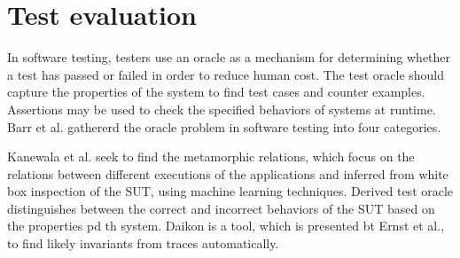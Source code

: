 
\section{Test evaluation}
	
In software testing, testers use an oracle as a mechanism for determining whether a test has passed or failed
in order to reduce human cost.
The test oracle should capture the properties of the system to find test cases and counter examples.
Assertions may be used to check the specified behaviors of systems at runtime.
Barr et al.\cite{OracleProblem} gathererd the oracle problem in software testing into four categories.

Kanewala et al.\cite{DetectMetamorphic} seek to find the metamorphic relations, 
which focus on the relations between different executions of the applications and inferred from white box inspection of the SUT,
using machine learning techniques.
Derived test oracle distinguishes between the correct and incorrect behaviors of the SUT based on the properties pd th system.
Daikon is a tool, which is presented bt Ernst et al.\cite{SupportProgramEvolution}, 
to find likely invariants from traces automatically.



